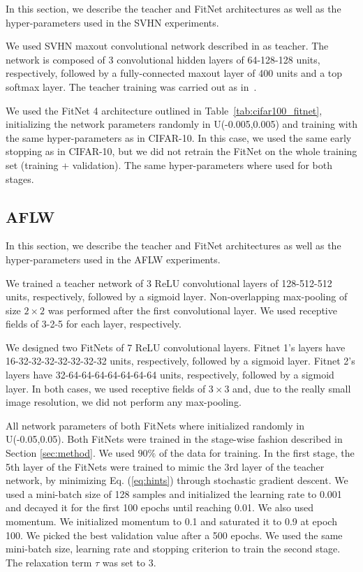 \documentclass{article} %
\begin{document}
In this section, we describe the teacher and FitNet architectures as well as the hyper-parameters used in the SVHN experiments.

We used SVHN maxout convolutional network described in as \citet{Goodfellow13} teacher. The network is composed of 3 convolutional hidden layers of 64-128-128 units, respectively, followed by a fully-connected maxout layer of 400 units and a top softmax layer. The teacher training was carried out as in~\citet{Goodfellow13}. 

We used the FitNet 4 architecture outlined in Table~\ref{tab:cifar100_fitnet}, initializing the network parameters randomly in U(-0.005,0.005) and training with the same hyper-parameters as in CIFAR-10. In this case, we used the same early stopping as in CIFAR-10, but we did not retrain the FitNet on the whole training set (training + validation). The same hyper-parameters where used for both stages.

\subsection{AFLW}

In this section, we describe the teacher and FitNet architectures as well as the hyper-parameters used in the AFLW experiments. 

We trained a teacher network of 3 ReLU convolutional layers of 128-512-512 units, respectively, followed by a sigmoid layer. Non-overlapping max-pooling of size $2 \times 2$ was performed after the first convolutional layer. We used receptive fields of 3-2-5 for each layer, respectively.

We designed two FitNets of 7 ReLU convolutional layers. Fitnet 1's layers have 16-32-32-32-32-32-32-32 units, respectively, followed by a sigmoid layer. Fitnet 2's layers have 32-64-64-64-64-64-64-64 units, respectively, followed by a sigmoid layer. In both cases, we used receptive fields of $3 \times 3$ and, due to the really small image resolution, we did not perform any max-pooling. 

All network parameters of both FitNets where initialized randomly in U(-0.05,0.05). Both FitNets were trained in the stage-wise fashion described in Section \ref{sec:method}. We used $90\%$ of the data for training. In the first stage, the 5th layer of the FitNets were trained to mimic the 3rd layer of the teacher network, by minimizing Eq. (\ref{eq:hints}) through stochastic gradient descent. We used a mini-batch size of 128 samples and initialized the learning rate to 0.001 and decayed it for the first 100 epochs until reaching 0.01. We also used momentum. We initialized momentum to 0.1 and saturated it to 0.9 at epoch 100. We picked the best validation value after a 500 epochs. We used the same mini-batch size, learning rate and stopping criterion to train the second stage. The relaxation term $\tau$ was set to 3.
\end{document}
